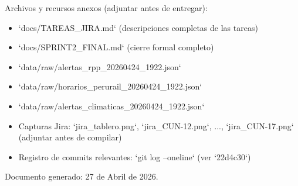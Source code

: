 \documentclass[12pt,a4paper]{article}
\newcommand{\sectiontitle}[1]{\vspace{0.6cm}\noindent{\fontsize{13}{15}\selectfont\textbf{#1}}\par\vspace{0.15cm}\noindent{\fontsize{12}{14}\selectfont}}
\newcommand{\bodytext}[1]{{\fontsize{12}{14}\selectfont #1}\par}
\begin{document}
\sectiontitle{Anexos}
\bodytext{Archivos y recursos anexos (adjuntar antes de entregar):}
\begin{itemize}
  \item `docs/TAREAS_JIRA.md` (descripciones completas de las tareas)
  \item `docs/SPRINT2_FINAL.md` (cierre formal completo)
  \item `data/raw/alertas_rpp_20260424_1922.json`
  \item `data/raw/horarios_perurail_20260424_1922.json`
  \item `data/raw/alertas_climaticas_20260424_1922.json`
  \item Capturas Jira: `jira_tablero.png`, `jira_CUN-12.png`, ..., `jira_CUN-17.png` (adjuntar antes de compilar)
  \item Registro de commits relevantes: `git log --oneline` (ver `22d4c30`)
\end{itemize}

\vspace{1cm}
\bodytext{Documento generado: 27 de Abril de 2026.}
\end{document}
